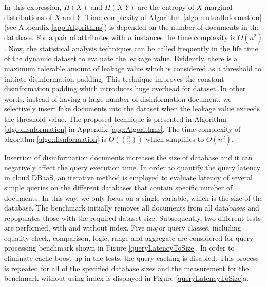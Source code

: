In this expression, $H\left(X\right)$ and $H\left(X|Y \right)$ are the entropy of $X$ marginal distributions of $X$ and $Y$. Time complexity of Algorithm \ref{algo:mutualInformation} (see Appendix \ref{app:Algorithms}) is depended on the number of documents in the database. For a pair of attributes with $n$ instances the time complexity is $O(n^2)$. Now, the statistical analysis techniques can be called frequently in the life time of the dynamic dataset to evaluate the leakage value. Evidently, there is a maximum tolerable amount of leakage value which is considered as a threshold to initiate disinformation padding. This technique improves the constant disinformation padding which introduces huge overhead for dataset. In other words, instead of having a huge number of disinformation document, we selectively insert fake documents into the dataset when the leakage value exceeds the threshold value. The proposed technique is presented in Algorithm \ref{algo:disnformation} in Appendix \ref{app:Algorithms}. The time complexity  of algorithm \ref{algo:disnformation} is $O(\binom n2)$ which simplifies to $O(n^2)$. 

\medskip

 Insertion of disinformation documents increases the size of database and it can negatively affect the query execution time. In order to quantify the query latency in cloud DBaaS, an iterative method is employed to evaluate latency of several simple queries on the different databases that contain specific number of documents. In this way, we only focus on a single variable, which is the size of the database. The benchmark initially removes all documents from all databases and repopulates those with the required dataset size. Subsequently, two different tests are performed, with and without index. Five major query classes, including equality check, comparison, logic, range and aggregate are considered for query processing benchmark shown in Figure \ref{queryLatencyToSize}. In order to eliminate cache boost-up in the tests, the query caching is disabled. This process is repeated for all of the specified database sizes and the measurement for the benchmark without using index is displayed in Figure \ref{queryLatencyToSize}a.\\



